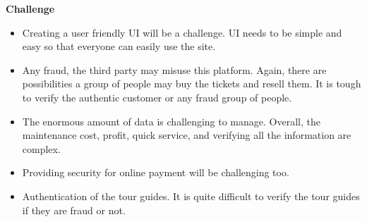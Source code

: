 \documentclass[]{article}
\begin{document}
\pagebreak

\textbf{\Large Challenge}

\begin{itemize}

\item
    Creating a user friendly UI will be a challenge. UI needs to be simple and easy so that everyone can easily use the site.
  
\item
  Any fraud, the third party may misuse this platform. Again, there are
  possibilities a group of people may buy the tickets and resell them.
  It is tough to verify the authentic customer or any fraud group of
  people.
\item
  The enormous amount of data is challenging to manage. Overall, the
  maintenance cost, profit, quick service, and verifying all the
  information are complex.
  
\item

  Providing security for online payment will be challenging too.
    
    
\item
  Authentication of the tour guides. It is quite difficult to verify
  the tour guides if they are fraud or not.~
     
  
  
  
  
\end{itemize}
\end{document}
